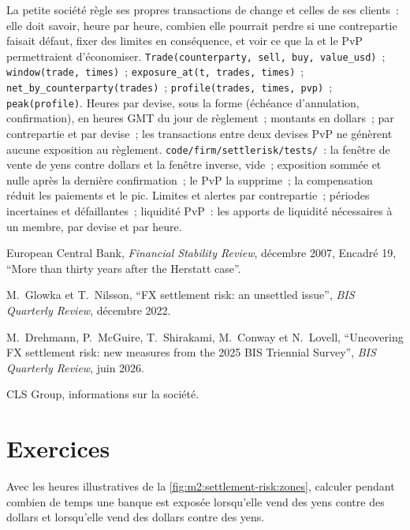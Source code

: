\begin{build}
 La petite société règle ses propres transactions de change et celles de ses
clients~: elle doit savoir, heure par heure, combien elle pourrait perdre si une
contrepartie faisait défaut, fixer des limites en conséquence, et voir ce que la  et le PvP permettraient d'économiser.
 \texttt{Trade(counterparty, sell, buy, value\_usd)}~;
\texttt{window(trade, times)}~; \texttt{exposure\_at(t, trades, times)}~;
\texttt{net\_by\_counterparty(trades)}~; \texttt{profile(trades, times, pvp)}~;
\texttt{peak(profile)}.
 Heures par devise, sous la forme (échéance d'annulation, confirmation), en
heures GMT du jour de règlement~; montants en dollars~;  par
contrepartie et par devise~; les transactions entre deux devises PvP ne génèrent aucune exposition au règlement.
 \texttt{code/firm/settlerisk/tests/}~: la fenêtre de vente de yens
contre dollars et la fenêtre inverse, vide~; exposition sommée et nulle après la dernière
confirmation~; le PvP la supprime~; la compensation réduit les paiements et le pic.
 Limites et alertes par contrepartie~; périodes incertaines et défaillantes~;
liquidité PvP~: les apports de liquidité nécessaires à un membre, par devise et par heure.
\end{build}

\begin{omsources}
\item European Central Bank, \emph{Financial Stability Review}, décembre 2007,
Encadré 19, ``More than thirty years after the Herstatt case''.
\item M.~Glowka et T.~Nilsson, ``FX settlement risk: an unsettled issue'',
\emph{BIS Quarterly Review}, décembre 2022.
\item M.~Drehmann, P.~McGuire, T.~Shirakami, M.~Conway et N.~Lovell, ``Uncovering FX settlement risk: new measures from the 2025 BIS Triennial Survey'',
\emph{BIS Quarterly Review}, juin 2026.
\item CLS Group, informations sur la société.
\end{omsources}

\section{Exercices}

\begin{exercise}[$\star$]\label{exo:m2:settlement-risk:1}
Avec les heures illustratives de la \cref{fig:m2:settlement-risk:zones}, calculer pendant
combien de temps une banque est exposée lorsqu'elle vend des yens contre des dollars et lorsqu'elle vend des dollars contre des yens.
\end{exercise}

